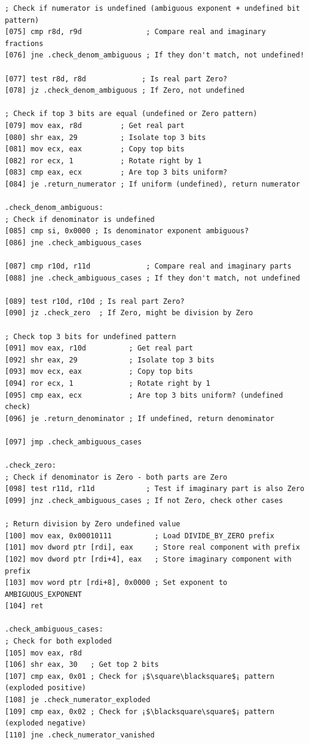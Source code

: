 \documentclass[12pt,letter]{article}
\begin{document}
\begin{lstlisting}[style=rust, caption={Complete Complex Division Assembly Implementation}, label={fig:circle_divide}]
; Check if numerator is undefined (ambiguous exponent + undefined bit pattern)
[075] cmp r8d, r9d               ; Compare real and imaginary fractions
[076] jne .check_denom_ambiguous ; If they don't match, not undefined!

[077] test r8d, r8d             ; Is real part Zero?
[078] jz .check_denom_ambiguous ; If Zero, not undefined

; Check if top 3 bits are equal (undefined or Zero pattern)
[079] mov eax, r8d         ; Get real part
[080] shr eax, 29          ; Isolate top 3 bits
[081] mov ecx, eax         ; Copy top bits
[082] ror ecx, 1           ; Rotate right by 1
[083] cmp eax, ecx         ; Are top 3 bits uniform?
[084] je .return_numerator ; If uniform (undefined), return numerator

.check_denom_ambiguous:
; Check if denominator is undefined
[085] cmp si, 0x0000 ; Is denominator exponent ambiguous?
[086] jne .check_ambiguous_cases

[087] cmp r10d, r11d             ; Compare real and imaginary parts
[088] jne .check_ambiguous_cases ; If they don't match, not undefined

[089] test r10d, r10d ; Is real part Zero?
[090] jz .check_zero  ; If Zero, might be division by Zero

; Check top 3 bits for undefined pattern
[091] mov eax, r10d          ; Get real part
[092] shr eax, 29            ; Isolate top 3 bits
[093] mov ecx, eax           ; Copy top bits
[094] ror ecx, 1             ; Rotate right by 1
[095] cmp eax, ecx           ; Are top 3 bits uniform? (undefined check)
[096] je .return_denominator ; If undefined, return denominator

[097] jmp .check_ambiguous_cases

.check_zero:
; Check if denominator is Zero - both parts are Zero
[098] test r11d, r11d            ; Test if imaginary part is also Zero
[099] jnz .check_ambiguous_cases ; If not Zero, check other cases

; Return division by Zero undefined value
[100] mov eax, 0x00010111          ; Load DIVIDE_BY_ZERO prefix
[101] mov dword ptr [rdi], eax     ; Store real component with prefix
[102] mov dword ptr [rdi+4], eax   ; Store imaginary component with prefix
[103] mov word ptr [rdi+8], 0x0000 ; Set exponent to AMBIGUOUS_EXPONENT
[104] ret

.check_ambiguous_cases:
; Check for both exploded
[105] mov eax, r8d
[106] shr eax, 30   ; Get top 2 bits
[107] cmp eax, 0x01 ; Check for ¡$\square\blacksquare$¡ pattern (exploded positive)
[108] je .check_numerator_exploded
[109] cmp eax, 0x02 ; Check for ¡$\blacksquare\square$¡ pattern (exploded negative)
[110] jne .check_numerator_vanished


\end{lstlisting}
\end{document}
